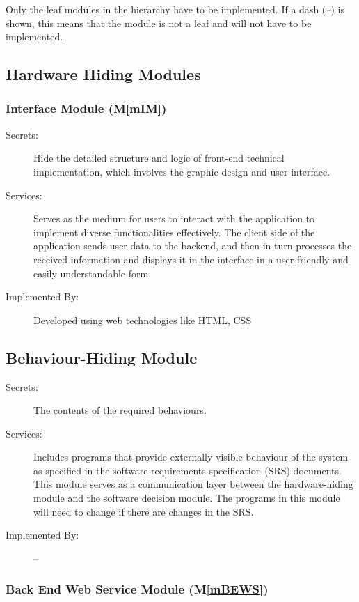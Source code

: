 \documentclass[12pt, titlepage]{article}
\newcommand{\mref}[1]{M\ref{#1}}
\begin{document}
Only the leaf modules in the hierarchy have to be implemented. If a dash
(\emph{--}) is shown, this means that the module is not a leaf and will not have
to be implemented.

\subsection{Hardware Hiding Modules }

\subsubsection{Interface Module (\mref{mIM})}
\begin{description}
\item[Secrets:]Hide the detailed structure and logic of front-end technical implementation, which involves the graphic design and user interface.
\item[Services:]Serves as the medium for users to interact with the application to implement diverse functionalities effectively. The client side of the application sends user data to the backend, and then in turn processes the received information and displays it in the interface in a user-friendly and easily understandable form. 
\item[Implemented By:] Developed using web technologies like HTML, CSS

\end{description}

\subsection{Behaviour-Hiding Module}

\begin{description}
\item[Secrets:]The contents of the required behaviours.
\item[Services:]Includes programs that provide externally visible behaviour of
  the system as specified in the software requirements specification (SRS)
  documents. This module serves as a communication layer between the
  hardware-hiding module and the software decision module. The programs in this
  module will need to change if there are changes in the SRS.
\item[Implemented By:] --
\end{description}

\subsubsection{Back End Web Service Module (\mref{mBEWS})}
\end{document}
